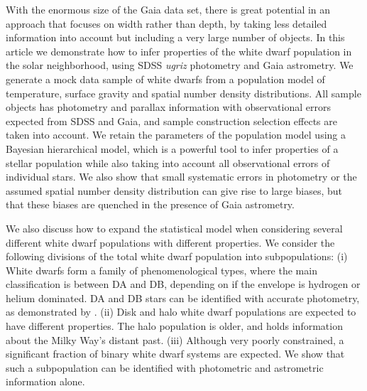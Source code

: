 \documentclass[fleqn,usenatbib]{mnras}
\begin{document}

With the enormous size of the Gaia data set, there is great potential in an approach that focuses on width rather than depth, by taking less detailed information into account but including a very large number of objects. In this article we demonstrate how to infer properties of the white dwarf population in the solar neighborhood, using SDSS \emph{ugriz} photometry and Gaia astrometry. We generate a mock data sample of white dwarfs from a population model of temperature, surface gravity and spatial number density distributions. All sample objects has photometry and parallax information with observational errors expected from SDSS and Gaia, and sample construction selection effects are taken into account. We retain the parameters of the population model using a Bayesian hierarchical model, which is a powerful tool to infer properties of a stellar population while also taking into account all observational errors of individual stars. We also show that small systematic errors in photometry or the assumed spatial number density distribution can give rise to large biases, but that these biases are quenched in the presence of Gaia astrometry.

We also discuss how to expand the statistical model when considering several different white dwarf populations with different properties. We consider the following divisions of the total white dwarf population into subpopulations: (i) White dwarfs form a family of phenomenological types, where the main classification is between DA and DB, depending on if the envelope is hydrogen or helium dominated. DA and DB stars can be identified with accurate photometry, as demonstrated by \cite{Mortlock:2008gf}. (ii) Disk and halo white dwarf populations are expected to have different properties. The halo population is older, and holds information about the Milky Way's distant past. (iii) Although very poorly constrained, a significant fraction of binary white dwarf systems are expected. We show that such a subpopulation can be identified with photometric and astrometric information alone.
\end{document}

